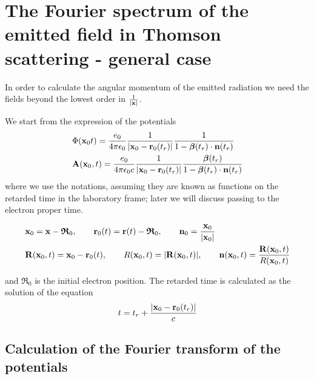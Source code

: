 \chapter{The Fourier spectrum of the emitted field in Thomson scattering - general case}

In order to calculate the angular momentum of the emitted radiation we need the fields beyond the lowest order in $\frac1{|{\bf x}|}$.

We start from the expression of the potentials
\begin{align}
     & \Phi({\bf x}_0t) = \frac{e_0}{4\pi\epsilon_0}\frac{1}{|{\bf x}_0-{\bf r}_0(t_r)|}\frac1{1-{\boldsymbol{\beta}(t_r)\cdot{\bf n}(t_r)}}                                  \\
     & {\bf A}({\bf x}_0,t) = \frac{e_0 }{4\pi\epsilon_0 c}\frac{1}{|{\bf x}_0-{\bf r}_0(t_r)|}\frac{{\boldsymbol{\beta}}(t_r)}{1-{\boldsymbol{\beta}(t_r)\cdot{\bf n}(t_r)}}
\end{align}
where we use the notations, {\color{red}assuming they are known as functions on the retarded time in the laboratory frame}; later we will discuss passing to the electron proper time.

\begin{tcolorbox}[colback=blue!5!white,colframe=blue!75!black]
    \begin{align}
         & {\bf x}_0={\bf x}-{\boldsymbol{\mathfrak{R}}}_0,\qquad {\bf r}_0(t)={\bf r}(t)-{\boldsymbol{\mathfrak{R}}}_0, \qquad {\bf n}_0=\frac{{\bf x}_0}{|{\bf x}_0|}    \nonumber \\
         & {\bf R}({\bf x}_0,t)={\bf x}_0-{\bf r}_0(t),\qquad R({\bf x}_0,t)=|{\bf R}({\bf x}_0,t)|,\qquad {\bf n}({\bf x}_0,t)=\frac{{\bf R}({\bf x}_0,t)}{R({\bf x}_0,t)}
    \end{align}
\end{tcolorbox}
and ${\boldsymbol{\mathfrak{R}}}_0$ is the initial electron position. The retarded time is calculated as the solution of the equation
\begin{align}
    t=t_r+\frac{|{\bf x}_0-{\bf r}_0(t_r)|}{c}
\end{align}

\section{Calculation of the Fourier transform of the potentials}
